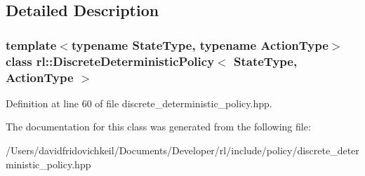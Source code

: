 \subsection{Detailed Description}
\subsubsection*{template$<$typename State\+Type, typename Action\+Type$>$\newline
class rl\+::\+Discrete\+Deterministic\+Policy$<$ State\+Type, Action\+Type $>$}



Definition at line 60 of file discrete\+\_\+deterministic\+\_\+policy.\+hpp.



The documentation for this class was generated from the following file\+:\begin{DoxyCompactItemize}
\item 
/\+Users/davidfridovichkeil/\+Documents/\+Developer/rl/include/policy/discrete\+\_\+deterministic\+\_\+policy.\+hpp\end{DoxyCompactItemize}
